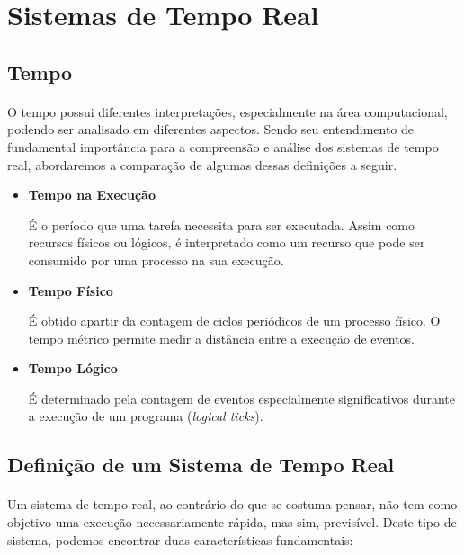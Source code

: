 \section{Sistemas de Tempo Real}

\subsection{Tempo}
\paragraph{}
O tempo possui diferentes interpretações, especialmente na área computacional,
podendo ser analisado em diferentes aspectos. Sendo seu entendimento de
fundamental importância para a compreensão e análise dos sistemas de tempo
real, abordaremos a comparação de algumas dessas definições a seguir.~\cite{Motus199321}

\begin{itemize}
\item \textbf{Tempo na Execução}

É o período que uma tarefa necessita para ser executada. Assim como recursos
físicos ou lógicos, é interpretado como um recurso que pode ser consumido
por uma processo na sua execução.

\item \textbf{Tempo Físico}

É obtido apartir da contagem de ciclos periódicos de um processo físico.
O tempo métrico permite medir a distância entre a execução de eventos.

\item \textbf{Tempo Lógico}

É determinado pela contagem de eventos especialmente significativos durante a execução de
um programa (\textit{logical ticks}).

\end{itemize}

\subsection{Definição de um Sistema de Tempo Real}
\paragraph{}
Um sistema de tempo real, ao contrário do que se costuma pensar, não tem
como objetivo uma execução necessariamente rápida, mas sim, previsível.
Deste tipo de sistema, podemos encontrar duas características fundamentais:

